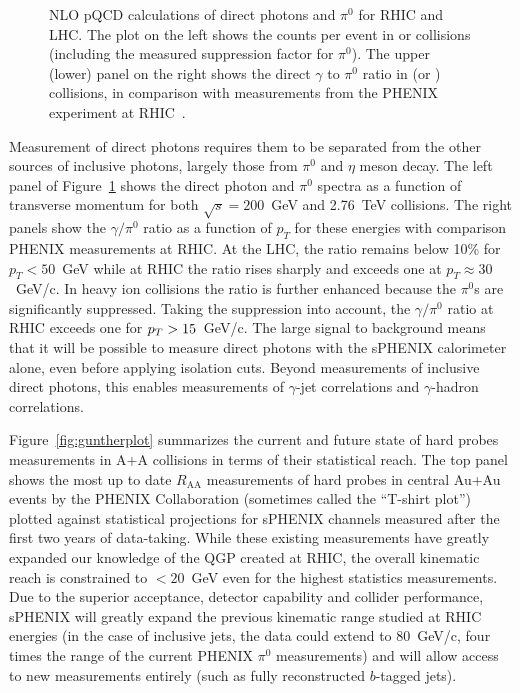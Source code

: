 \begin{figure}[!hbt]
{\begin{minipage}[c]{0.28\linewidth}
 \end{minipage}
}
\caption[NLO pQCD calculations of direct photons and $\pi^{0}$ for
RHIC and LHC, compared to PHENIX measurements of direct $\gamma$ to
$\pi^{0}$ ratio in \pp (\auau or \pbpb)
collisions]{\label{fig:nlo_gammarates}NLO pQCD calculations of direct
  photons and $\pi^{0}$ for RHIC and LHC.  The plot on the left shows
  the counts per event in \auau or \pbpb collisions (including the
  measured \raa suppression factor for $\pi^{0}$).  The upper
  (lower) panel on the right shows the direct $\gamma$ to $\pi^{0}$
  ratio in \pp (\auau or \pbpb) collisions, in comparison with
  measurements from the PHENIX experiment at
  RHIC~\cite{Afanasiev:2012dg,Adare:2012yt}.}
\end{figure}    

Measurement of direct photons requires them to be separated from the
other sources of inclusive photons, largely those from $\pi^0$ and
$\eta$ meson decay.  The left panel of Figure~\ref{fig:nlo_gammarates}
shows the direct photon and $\pi^0$ spectra as a function of
transverse momentum for both $\sqrt{s}=200$~GeV and 2.76~TeV \pp
collisions.  The right panels show the $\gamma/\pi^0$ ratio as a
function of $p_T$ for these energies with comparison PHENIX
measurements at RHIC.  At the LHC, the ratio remains below 10\% for
$p_T < 50$~GeV while at RHIC the ratio rises sharply and exceeds one
at $p_T\approx 30$~GeV/c.  In heavy ion collisions the ratio is
further enhanced because the $\pi^0$s are significantly suppressed.
Taking the suppression into account, the $\gamma/\pi^0$ ratio at RHIC
exceeds one for $\mbox{${p_T}$} > 15$~GeV/c.  The large signal to background
means that it will be possible to measure direct photons with the
sPHENIX calorimeter alone, even before applying isolation cuts.
Beyond measurements of inclusive direct photons, this enables
measurements of $\gamma$-jet correlations and $\gamma$-hadron
correlations.

Figure~\ref{fig:guntherplot} summarizes the current and future state
of hard probes measurements in A+A collisions in terms of their
statistical reach. The top panel shows the most up to date $R_\mathrm{AA}$ measurements of hard probes in central
Au+Au events by the PHENIX Collaboration (sometimes called the
``T-shirt plot'') plotted against statistical projections for sPHENIX
channels measured after the first two years of data-taking. 
While these existing measurements have greatly expanded our
knowledge of the QGP created at RHIC, the overall kinematic reach is
constrained to $< 20$~GeV even for the highest statistics
measurements. Due to the superior acceptance, detector capability and
collider performance, sPHENIX will greatly expand the previous
kinematic range studied at RHIC energies (in the case of inclusive
jets, the data could extend to $80$~GeV/c, four times the range of the
current PHENIX $\pi^0$ measurements) and will allow access to new
measurements entirely (such as fully reconstructed $b$-tagged jets).

